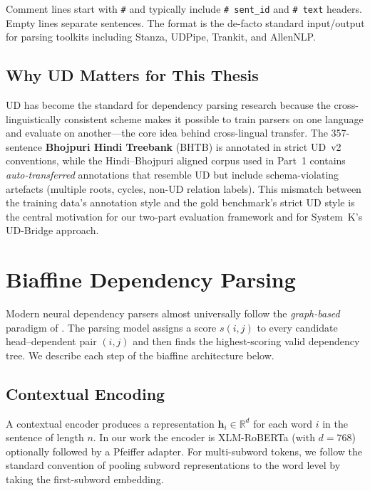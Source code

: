 \documentclass[12pt,a4paper,oneside]{report}
\newcommand{\xlmr}{XLM-RoBERTa}
\begin{document}
Comment lines start with \texttt{\#} and typically include
\texttt{\# sent\_id} and \texttt{\# text} headers. Empty lines separate
sentences. The format is the de-facto standard input/output for parsing
toolkits including Stanza, UDPipe, Trankit, and AllenNLP.

\subsection{Why UD Matters for This Thesis}

UD has become the standard for dependency parsing research because the
cross-linguistically consistent scheme makes it possible to train parsers on
one language and evaluate on another---the core idea behind cross-lingual
transfer. The 357-sentence \textbf{Bhojpuri Hindi Treebank} (BHTB) is annotated
in strict UD~v2 conventions, while the Hindi--Bhojpuri aligned corpus used in
Part~1 contains \emph{auto-transferred} annotations that resemble UD but
include schema-violating artefacts (multiple roots, cycles, non-UD relation
labels). This mismatch between the training data's annotation style and the
gold benchmark's strict UD style is the central motivation for our
two-part evaluation framework and for System~K's UD-Bridge approach.

\section{Biaffine Dependency Parsing}
\label{sec:biaffine}

Modern neural dependency parsers almost universally follow the \emph{graph-based}
paradigm of \citet{dozat2017deep}. The parsing model assigns a score $s(i,j)$ to
every candidate head--dependent pair $(i,j)$ and then finds the highest-scoring
valid dependency tree. We describe each step of the biaffine architecture below.

\subsection{Contextual Encoding}

A contextual encoder produces a representation $\mathbf{h}_i \in \mathbb{R}^{d}$
for each word $i$ in the sentence of length $n$. In our work the encoder is
\xlmr{} (with $d = 768$) optionally followed by a Pfeiffer adapter. For
multi-subword tokens, we follow the standard convention of pooling subword
representations to the word level by taking the first-subword embedding.
\end{document}
